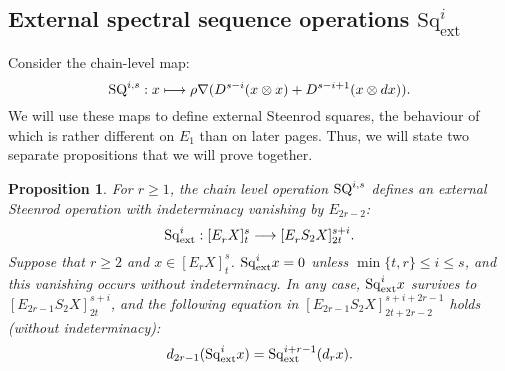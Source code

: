 \documentclass[11pt]{amsart} \renewcommand{\baselinestretch}{1.2}
\theoremstyle{plain}
\newtheorem{prop}[thm]{Proposition}
\numberwithin{equation}{section} %
\theoremstyle{plain}
\newtheorem{prop}[thm]{Proposition}
\numberwithin{equation}{chapter} %
\let\oldphi\phi
\let\phi\varphi
\renewcommand{\to}{\longrightarrow}
\newcommand{\calV}{\mathcal{V}}
\newcommand{\vect}[2]{\calV^{#1}_{#2}}
\newcommand{\Nabla}{\nabla}
\newcommand{\Sq}{\mathrm{Sq}}
\newcommand{\Edownup}[5]{[E_{#1}^{#2}#3]^{#4}_{#5}}
\newcommand{\dhor}{_\mathrm{h}}
\renewcommand{\mapsto}{\longmapsto}
\newcommand{\SubsectionOrSection}[1]{\subsection{#1}}
\begin{document}
\begin{second quadrant homotopy sseq operations}
\SubsectionOrSection{External spectral sequence operations $\Sq_\mathrm{ext}^i$}
\label{External spectral sequence operations Sq}
Consider the chain-level map:
\[\textup{SQ}^{i,s}:x\mapsto \rho\Nabla (D^{s-i}(x\otimes x)+D^{s-i+1}(x\otimes dx)).\]
We will use these maps to define external Steenrod squares, the behaviour of which is rather different on $E_1$ than on later pages. Thus, we will state two separate propositions that we will prove together.

\begin{prop}
\label{prop on e1 steens 1}
For $r\geq1$, the chain level operation $\textup{SQ}^{i,s}$ defines an \emph{external Steenrod operation} with indeterminacy vanishing by $E_{2r-2}$:
\[\Sq^i_\textup{ext}:\Edownup{r}{}{X}{s}{t}\to \Edownup{r}{}{S_2X}{s+i}{2t}.\]
Suppose that $r\geq 2$ and $x\in\Edownup{r}{}{X}{s}{t}$. $\Sq^i_\textup{ext}x=0$ unless $\min\{t,r\}\leq i\leq s$,  and this vanishing occurs without indeterminacy.
In any case, $\Sq^i_\textup{ext}x$ survives to $\Edownup{2r-1}{}{S_2X}{s+i}{2t}$, and the following equation in $\Edownup{2r-1}{}{S_2X}{s+i+2r-1}{2t+2r-2}$ holds (without indeterminacy): \[d_{2r-1}(\Sq^i_\textup{ext}x)=\Sq^{i+r-1}_\textup{ext}(d_rx).\]


\end{prop}
\end{second quadrant homotopy sseq operations}
\end{document}

